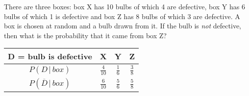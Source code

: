 
%
%
%
%
% 
% 

\question There are three boxes: box X has 10 bulbs of which 4 are defective, 
box Y has 6 bulbs of which 1 is defective and box Z has 8 bulbs of which 3 are defective. 
A box is chosen at random and a bulb drawn from it. If the bulb is \textit{not} defective,
then what is the probability that it came from box Z?

\insertQR{}

\ifprintanswers
  \begin{table}[ht]
    \begin{tabular}{cccc}
      \toprule
      D = bulb is defective & X & Y & Z \\
      \midrule
      $P(D\,\vert\, box)$ & $\frac{4}{10}$ & $\frac{1}{6}$ & $\frac{3}{8}$ \\
      $P(\overline{D}\,\vert\, box)$ & $\frac{6}{10}$ & $\frac{5}{6}$ & $\frac{5}{8}$ \\
      \bottomrule
    \end{tabular}
  \end{table}
\fi 

